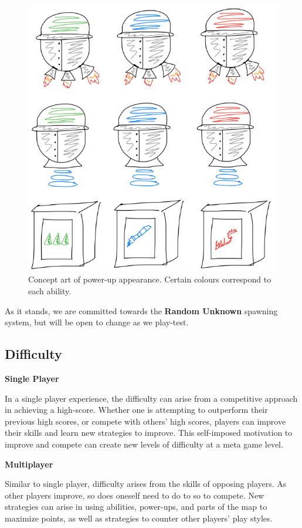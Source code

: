 \documentclass{article}
\theoremstyle{definition}
\begin{document}
\begin{figure}[htpb]
  \centering
  \includegraphics[width=0.8\linewidth]{images/powerups_known.png}
  \caption{Concept art of power-up appearance. Certain colours correspond to each ability.}
\label{fig:powerups_known}
\end{figure}


As it stands, we are committed towards the \textbf{Random Unknown} spawning
system, but will be open to change as we play-test.

\subsection{Difficulty}

\textbf{Single Player}

In a single player experience, the difficulty can arise
from a competitive approach in achieving a high-score. Whether one is
attempting to outperform their previous high scores, or compete with others'
high scores, players can improve their skills and learn new strategies to
improve. This self-imposed motivation to improve and compete can create new
levels of difficulty at a meta game level.

\textbf{Multiplayer}

Similar to single player, difficulty arises from the skills of opposing
players. As other players improve, so does oneself need to do to so to compete.
New strategies can arise in using abilities, power-ups, and parts of the map to
maximize points, as well as strategies to counter other players' play styles.
\end{document}
